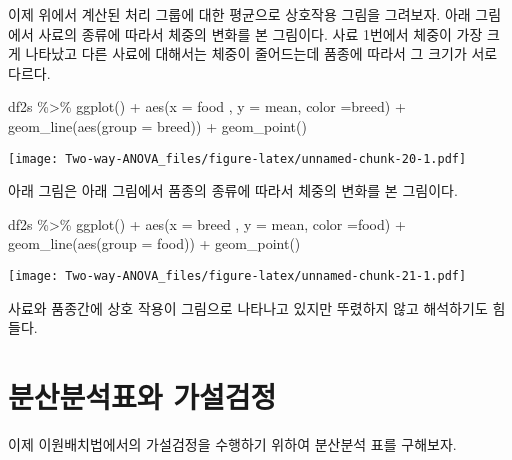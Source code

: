 \documentclass[
]{book}
\newenvironment{Shaded}{\begin{snugshade}}{\end{snugshade}}
\newcommand{\AttributeTok}[1]{\textcolor[rgb]{0.77,0.63,0.00}{#1}}
\newcommand{\FunctionTok}[1]{\textcolor[rgb]{0.00,0.00,0.00}{#1}}
\newcommand{\NormalTok}[1]{#1}
\newcommand{\SpecialCharTok}[1]{\textcolor[rgb]{0.00,0.00,0.00}{#1}}
\begin{document}
이제 위에서 계산된 처리 그룹에 대한 평균으로 상호작용 그림을 그려보자. 아래 그림에서 사료의 종류에 따라서 체중의 변화를 본 그림이다. 사료 1번에서 체중이 가장 크게 나타났고 다른 사료에 대해서는 체중이 줄어드는데 품종에 따라서 그 크기가 서로 다르다.

\begin{Shaded}
\begin{Highlighting}[]
\NormalTok{df2s }\SpecialCharTok{\%\textgreater{}\%} 
  \FunctionTok{ggplot}\NormalTok{() }\SpecialCharTok{+}
  \FunctionTok{aes}\NormalTok{(}\AttributeTok{x =}\NormalTok{ food , }\AttributeTok{y =}\NormalTok{ mean, }\AttributeTok{color =}\NormalTok{breed) }\SpecialCharTok{+}
  \FunctionTok{geom\_line}\NormalTok{(}\FunctionTok{aes}\NormalTok{(}\AttributeTok{group =}\NormalTok{ breed)) }\SpecialCharTok{+}
  \FunctionTok{geom\_point}\NormalTok{()}
\end{Highlighting}
\end{Shaded}

\texttt{[image: Two-way-ANOVA\_files/figure-latex/unnamed-chunk-20-1.pdf]}

아래 그림은 아래 그림에서 품종의 종류에 따라서 체중의 변화를 본 그림이다.

\begin{Shaded}
\begin{Highlighting}[]
\NormalTok{df2s }\SpecialCharTok{\%\textgreater{}\%} 
  \FunctionTok{ggplot}\NormalTok{() }\SpecialCharTok{+}
  \FunctionTok{aes}\NormalTok{(}\AttributeTok{x =}\NormalTok{ breed , }\AttributeTok{y =}\NormalTok{ mean, }\AttributeTok{color =}\NormalTok{food) }\SpecialCharTok{+}
  \FunctionTok{geom\_line}\NormalTok{(}\FunctionTok{aes}\NormalTok{(}\AttributeTok{group =}\NormalTok{ food)) }\SpecialCharTok{+}
  \FunctionTok{geom\_point}\NormalTok{()}
\end{Highlighting}
\end{Shaded}

\texttt{[image: Two-way-ANOVA\_files/figure-latex/unnamed-chunk-21-1.pdf]}

사료와 품종간에 상호 작용이 그림으로 나타나고 있지만 뚜렸하지 않고 해석하기도 힘들다.

\hypertarget{uxbd84uxc0b0uxbd84uxc11duxd45cuxc640-uxac00uxc124uxac80uxc815-1}{%
\section{분산분석표와 가설검정}\label{uxbd84uxc0b0uxbd84uxc11duxd45cuxc640-uxac00uxc124uxac80uxc815-1}}

이제 이원배치법에서의 가설검정을 수행하기 위하여 분산분석 표를 구해보자.
\end{document}
